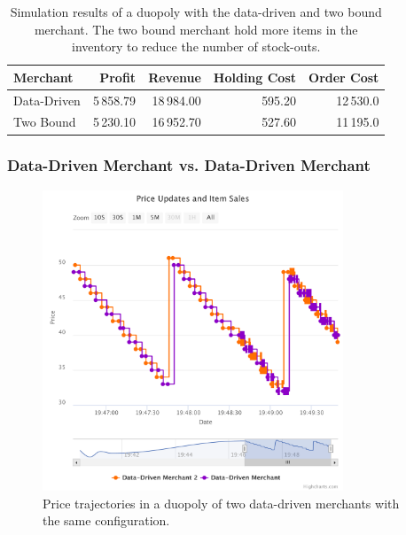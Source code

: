 \begin{table}[t]
	\centering
	\begin{tabular}{lrrrr}
		\toprule
		\textbf{Merchant} & \textbf{Profit} & \textbf{Revenue} & \textbf{Holding Cost} & \textbf{Order Cost} \\
		\midrule
		Data-Driven & 5\,858.79 & 18\,984.00 & 595.20 & 12\,530.0 \\
		Two Bound & 5\,230.10 & 16\,952.70 & 527.60 & 11\,195.0 \\
		\bottomrule
	\end{tabular}
	\caption{Simulation results of a duopoly with the data-driven and two bound merchant. The two bound merchant hold more items in the inventory to reduce the number of stock-outs.}
	\label{tab:duopoly_bound_2}
\end{table}

\subsubsection{Data-Driven Merchant vs. Data-Driven Merchant}

\begin{figure}[t]
	\centering
	\includegraphics[width=0.8\textwidth]{figures/duopoly_data_prices}
	\caption[Price trajectories: data-driven merchant versus data-driven merchant]{Price trajectories in a duopoly of two data-driven merchants with the same configuration.}
	\label{fig:duopoly_data_prices}
\end{figure}

